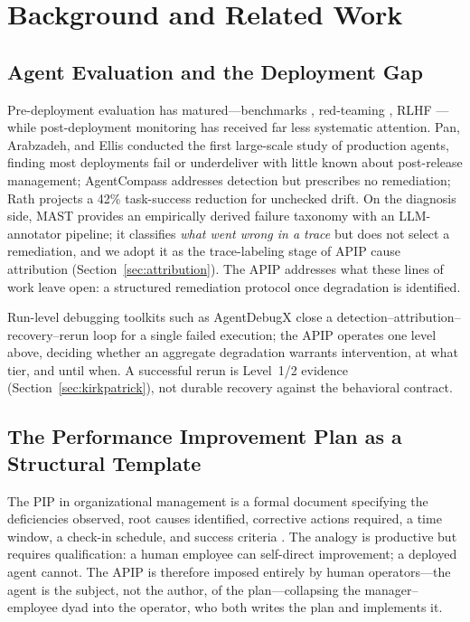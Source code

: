 \documentclass[conference]{IEEEtran}
\begin{document}
\section{Background and Related Work}

\subsection{Agent Evaluation and the Deployment Gap}

Pre-deployment evaluation has matured---benchmarks \cite{liang2022},
red-teaming \cite{ganguli2022}, RLHF \cite{ouyang2022}---while post-deployment
monitoring has received far less systematic attention. Pan, Arabzadeh, and
Ellis \cite{pan2025} conducted the first large-scale study of production
agents, finding most deployments fail or underdeliver with little known about
post-release management; AgentCompass \cite{sapra2025} addresses detection but
prescribes no remediation; Rath \cite{rath2026} projects a 42\% task-success
reduction for unchecked drift. On the diagnosis side, MAST \cite{cemri2025}
provides an empirically derived failure taxonomy with an LLM-annotator
pipeline; it classifies \emph{what went wrong in a trace} but does not select a
remediation, and we adopt it as the trace-labeling stage of APIP cause
attribution (Section~\ref{sec:attribution}). The APIP addresses what these
lines of work leave open: a structured remediation protocol once degradation is
identified.

Run-level debugging toolkits such as AgentDebugX \cite{zhu2026} close a
detection--attribution--recovery--rerun loop for a single failed execution; the
APIP operates one level above, deciding whether an aggregate degradation
warrants intervention, at what tier, and until when. A successful rerun is
Level~1/2 evidence (Section~\ref{sec:kirkpatrick}), not durable recovery
against the behavioral contract.

\subsection{The Performance Improvement Plan as a Structural Template}

The PIP in organizational management is a formal document specifying the
deficiencies observed, root causes identified, corrective actions required, a
time window, a check-in schedule, and success criteria \cite{kirkpatrick2016}.
The analogy is productive but requires qualification: a human employee can
self-direct improvement; a deployed agent cannot. The APIP is therefore imposed
entirely by human operators---the agent is the subject, not the author, of the
plan---collapsing the manager--employee dyad into the operator, who both writes
the plan and implements it.
\end{document}
